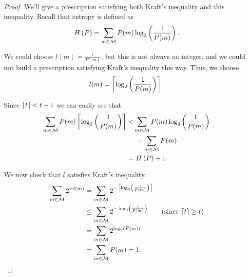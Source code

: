 \begin{proof}
	We'll give a prescription satisfying both Kraft's inequality and this inequality. 
	Recall that entropy is defined as
	\begin{equation*}
		H\left({P}\right) = \sum_{m \in \mathcal{M}} P(m) \log_2 \left( \frac{1}{P(m)} \right). 
	\end{equation*}

	We could choose $l(m) = \frac{1}{P(m)}$, but this is not always an integer, and we could not build a prescription satisfying Kraft's inequality this way.
	Thus, we choose
	\begin{equation*}
		l(m) = \left\lceil{\log_2 \left( \frac{1}{P(m)} \right)}\right\rceil.
	\end{equation*}

	Since $\left\lceil{t}\right\rceil < t + 1$ we can easily see that 
	\begin{align*}
		\sum_{m \in \mathcal{M}} P(m) \left\lceil{\log_2 \left( \frac{1}{P(m)} \right) }\right\rceil
		< &
		\sum_{m \in \mathcal{M}} P(m) \log_2 \left( \frac{1}{P(m)} \right)
		\\
		&~+
		\sum_{m \in \mathcal{M}} P(m)
		\\
		= &~H\left({P}\right) + 1. 
	\end{align*}

	We now check that $l$ satisfies Kraft's inequality.
	\begin{align*}
		\sum_{m \in \M} 2^{-l(m)}
		& =
		\sum_{m \in \M} 2^{-\ceil{\log_2 \left( \frac{1}{P(m)} \right)}}
		\\ 
		& \le
		\sum_{m \in \M} 2^{-\log_2 \left( \frac{1}{P(m)} \right)}
		\tag{since $\ceil{t} \ge t$}
		\\ 
		& =
		\sum_{m \in \M} 2^{\log_2 (P(m))}
		\\
		& =
		\sum_{m \in \M} P(m) = 1. \qedhere
	\end{align*}
\end{proof}

